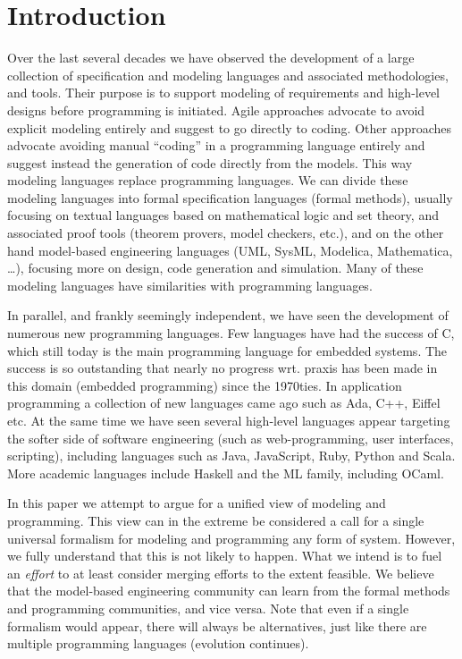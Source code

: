 
\section{Introduction}
\label{sec:introduction}

Over the last several decades we have observed the development of a 
large collection of specification and modeling languages and 
associated methodologies, and tools. Their purpose is to 
support modeling of requirements and high-level designs before 
programming is initiated. Agile approaches advocate to avoid 
explicit modeling entirely and suggest to go directly to coding. 
Other approaches advocate avoiding manual “coding” in a programming 
language entirely and suggest instead the generation of code 
directly from the models. This way modeling languages replace 
programming languages.  We can divide these modeling languages into 
formal specification languages (formal methods), usually focusing 
on textual languages based on mathematical logic and set theory, 
and associated proof tools (theorem provers, model checkers, etc.), 
and on the other hand model-based engineering languages (UML, 
SysML, Modelica, Mathematica, …), focusing more on design, code 
generation and simulation. Many of these modeling languages have 
similarities with programming languages.

In parallel, and frankly seemingly independent, we have seen the 
development of numerous new programming languages. Few languages 
have had the success of C, which still today is the main 
programming language for embedded systems. The success is so 
outstanding that nearly no progress wrt. praxis has been made in 
this domain (embedded programming) since the 1970ties.  In 
application programming a collection of new languages came ago such 
as Ada, C++, Eiffel etc. At the same time we have seen several 
high-level languages appear targeting the softer side of software 
engineering (such as web-programming, user interfaces, scripting), 
including languages such as Java, JavaScript, Ruby, Python and 
Scala.  More academic languages include Haskell and the ML family, 
including OCaml.

In this paper we attempt to argue for a unified view of modeling
and programming. This view can in the extreme be considered a call
for a single universal formalism for modeling and programming any
form of system. However, we fully understand that this is not likely
to happen. What we intend is to fuel an {\em effort} to at least consider
merging efforts to the extent feasible. We believe that the model-based
engineering community can learn from the formal methods and 
programming communities, and vice versa. Note that even if a single
formalism would appear, there will always be alternatives, just like
there are multiple programming languages (evolution continues). 

